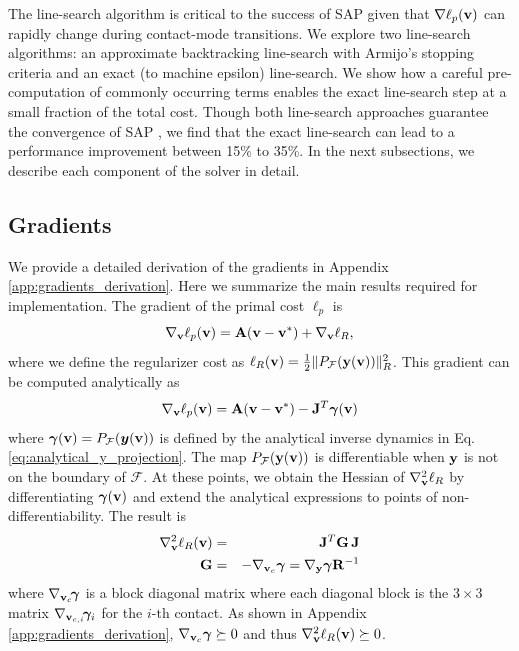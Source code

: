 The line-search algorithm is critical to the success of SAP
given that $\nabla \ell_p({\mathbf{v}})$ can rapidly change during 
contact-mode transitions.  We explore two line-search
algorithms: an approximate backtracking line-search with Armijo's stopping
criteria and an exact (to machine epsilon) line-search. We show how a careful
pre-computation of commonly occurring terms enables the exact line-search step
at a small fraction of the total cost. Though both line-search approaches
guarantee the convergence of SAP , we find
that the exact line-search can lead to a performance improvement between 15\% to
35\%. In the next subsections, we describe each component of the solver in
detail.

\subsection{Gradients}
\label{sec:gradients}

We provide a detailed derivation of the gradients in Appendix
\ref{app:gradients_derivation}. Here we summarize the main results required for
implementation. The gradient of the
primal cost $\ell_p$ is
\begin{equation*}
	\nabla_{\mathbf{v}}\ell_p({\mathbf{v}}) = {\mathbf{A}}({\mathbf{v}}-{\mathbf{v}}^*) + \nabla_{\mathbf{v}}\ell_R,
\end{equation*}
where we define the regularizer cost as $\ell_R({\mathbf{v}})=\frac{1}{2}\Vert
P_\mathcal{F}({\mathbf{y}}({\mathbf{v}}))\Vert_R^2$. This gradient can be computed analytically as
\begin{equation}
	\nabla_\mf{v}\ell_p(\mf{v}) = \mf{A}(\mf{v}-\mf{v}^*) - \mf{J}^T\bgamma(\mf{v})
	\label{eq:primal_gradient}
\end{equation}
where ${\bm\gamma}({\mathbf{v}})=P_\mathcal{F}({\bm{y}}({\mathbf{v}}))$ is defined by the analytical inverse
dynamics in Eq. \eqref{eq:analytical_y_projection}. 
The map $P_\mathcal{F}({\mathbf{y}}({\mathbf{v}}))$ is differentiable
when ${\mathbf{y}}$ is not on the boundary of $\mathcal{F}$.
At these points, we obtain the Hessian of $\nabla_{\mathbf{v}}^2\ell_R$  by differentiating ${\bm\gamma}({\mathbf{v}})$ and extend the analytical expressions to points of non-differentiability. The result is
\begin{eqnarray}
	\nabla_\mf{v}^2\ell_R(\mf{v}) &=& \mf{J}^T\mf{G}\,\mf{J}\nonumber\\
	\mf{G} &=&-\nabla_{\mf{v}_c}\bgamma = \nabla_\mf{y}\bgamma \mf{R}^{-1}
	\label{eq:ellR_hessian}
\end{eqnarray}
where $\nabla_{{\mathbf{v}}_c}\!{\bm\gamma}$ is a block diagonal matrix where each
diagonal block is the $3\times 3$ matrix $\nabla_{{\mathbf{v}}_{c,i}}\!{\bm\gamma}_i$
for the $i\text{-th}$ contact. As shown in Appendix
\ref{app:gradients_derivation}, $\nabla_{{\mathbf{v}}_c}{\bm\gamma}\succeq 0$ and thus
$\nabla_{\mathbf{v}}^2\ell_R({\mathbf{v}})\succeq 0$.

